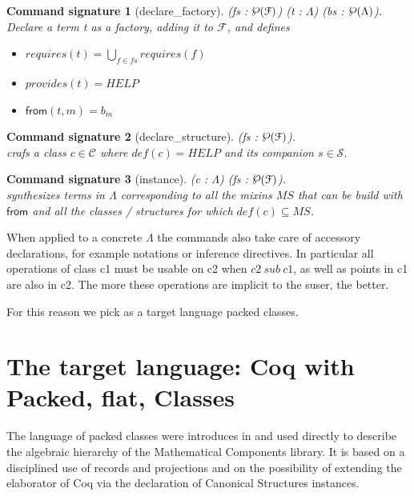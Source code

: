 \documentclass[a4paper,UKenglish,cleveref, autoref]{lipics-v2019}
\newcommand{\Lang}{\ensuremath{\Lambda}}
\newcommand{\mixins}{mixins}
\newcommand{\factory}{factory}
\newcommand{\F}{\ensuremath{\mathcal{F}}}
\newcommand{\powerset}[1]{\raisebox{.15\baselineskip}{\Large\ensuremath{\wp}}(#1)}
\newcommand{\C}{\ensuremath{\mathcal{C}}}
\newcommand{\classes}{classes}
\newcommand{\cdef}{\ensuremath{def}}
\newcommand{\Str}{\ensuremath{\mathcal{S}}}
\newcommand{\structures}{structures}
\newcommand{\issubclass}{\ensuremath{sub}}
\newcommand{\requires}{\ensuremath{requires}}
\newcommand{\provides}{\ensuremath{provides}}
\newcommand{\from}{\ensuremath{\mathsf{from}}}
\theoremstyle{implem}
\theoremstyle{implem}
\theoremstyle{axiom}
\theoremstyle{abscommand}
\newtheorem*{abscommand}{Command signature}
\theoremstyle{command}
\begin{document}
\begin{abscommand}[declare_factory] (fs : $\powerset\F{}$) (t : \Lang{}) (bs : $\powerset\Lang{}$).\\
Declare a term t as a \factory{}, adding it to \F{}, and defines
\begin{itemize}
\item \( \requires{}(t) = \bigcup_{f \in fs} \requires{}(f) \)
\item \( \provides{}(t) = HELP \)
\item \( \from{}(t,m) = b_m \)
\end{itemize}
\end{abscommand}

\begin{abscommand}[declare_structure] (fs : $\powerset\F{}$).\\
crafs a class $c \in \C{}$ where $\cdef{}(c) = HELP$ and its companion $s \in \Str{}$.
\end{abscommand}

\begin{abscommand}[instance] (c : $\Lang{}$) (fs : $\powerset\F{}$).\\
synthesizes terms in $\Lang{}$ corresponding to all the \mixins{} $MS$
that can be build with \from{} and all the \classes{} / \structures{}
for which \( \cdef{}(c) \subseteq MS \).
\end{abscommand}

When applied to a concrete \Lang{} the commands also take care of
accessory declarations, for example notations or inference directives.
In particular all operations of class c1 must be usable on c2 when
$c2~\issubclass{}~c1$, as well as points in c1 are also in c2.
The more these operations are implicit to the suser, the better.

For this reason we pick as a target language packed classes.

\section{The target language: Coq with Packed, flat, Classes}
The language of packed classes were introduces in
\cite{DBLP:conf/tphol/GarillotGMR09} and used directly to describe the
algebraic hierarchy of the Mathematical Components library.
It is based on a disciplined use of records and projections and
on the possibility of extending the elaborator of Coq
via the declaration of Canonical Structures instances.
\end{document}
